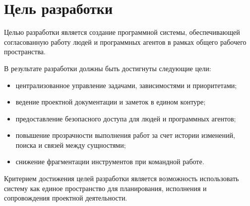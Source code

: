\section{Цель разработки}

\headingtextsep

Целью разработки является создание программной системы, обеспечивающей согласованную работу людей и программных агентов в рамках общего рабочего пространства.

В результате разработки должны быть достигнуты следующие цели:

\begin{itemize}
    \item централизованное управление задачами, зависимостями и приоритетами;
    \item ведение проектной документации и заметок в едином контуре;
    \item предоставление безопасного доступа для людей и программных агентов;
    \item повышение прозрачности выполнения работ за счет истории изменений, поиска и связей между сущностями;
    \item снижение фрагментации инструментов при командной работе.
\end{itemize}

Критерием достижения целей разработки является возможность использовать систему как единое пространство для планирования, исполнения и сопровождения проектной деятельности.